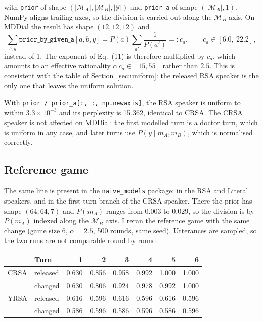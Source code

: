 \documentclass[11pt,a4paper]{article}
\newcommand{\code}[1]{\texttt{\small #1}}
\begin{document}
with \code{prior} of shape $(|\mathcal{M}_A|, |\mathcal{M}_B|, |\mathcal{Y}|)$ and \code{prior\_a} of
shape $(|\mathcal{M}_A|, 1)$. NumPy aligns trailing axes, so the division is carried out along the
$\mathcal{M}_B$ axis. On MDDial the result has shape $(12, 12, 12)$ and
\[
\sum_{b, y} \texttt{prior\_by\_given\_a}[a, b, y] = P(a) \sum_{a'} \frac{1}{P(a')} =: c_a,
\qquad c_a \in [6.0,\ 22.2],
\]
instead of 1. The exponent of Eq.~(11) is therefore multiplied by $c_a$, which amounts to an
effective rationality $\alpha\, c_a \in [15, 55]$ rather than $2.5$. This is consistent with the
table of Section~\ref{sec:uniform}: the released RSA speaker is the only one that leaves the uniform
solution.

With \code{prior / prior\_a[:, :, np.newaxis]}, the RSA speaker is uniform to within
$3.3 \times 10^{-3}$ and its perplexity is 15.362, identical to CRSA. The CRSA speaker is not
affected on MDDial: the first modelled turn is a doctor turn, which is uniform in any case, and
later turns use $P(y \mid m_A, m_B)$, which is normalised correctly.

\subsection{Reference game}
\label{sec:refgame}

The same line is present in the \code{naive\_models} package: in the RSA and Literal speakers,
and in the first-turn branch of the CRSA speaker. There the prior has shape $(64, 64, 7)$ and $P(m_A)$ ranges
from $0.003$ to $0.029$, so the division is by $P(m_A)$ indexed along the $\mathcal{M}_B$ axis. I
reran the reference game with the same change (game size 6, $\alpha = 2.5$, 500 rounds, same seed).
Utterances are sampled, so the two runs are not comparable round by round.

\begin{center}
\begin{tabular}{llrrrrrr}
\toprule
 & Turn & 1 & 2 & 3 & 4 & 5 & 6 \\
\midrule
CRSA & released & 0.630 & 0.856 & 0.958 & 0.992 & 1.000 & 1.000 \\
     & changed  & 0.630 & 0.806 & 0.924 & 0.978 & 0.992 & 1.000 \\
\midrule
YRSA & released & 0.616 & 0.596 & 0.616 & 0.596 & 0.616 & 0.596 \\
     & changed  & 0.586 & 0.596 & 0.586 & 0.596 & 0.586 & 0.596 \\
\bottomrule
\end{tabular}
\end{center}
\end{document}
